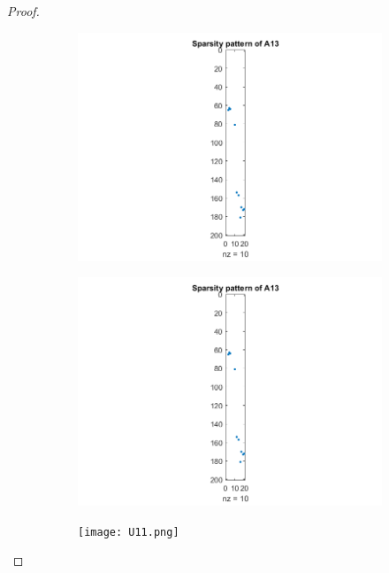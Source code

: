 \documentclass[12pt]{report}
\begin{document}
\begin{problem}
\begin{proof}
\begin{figure}[H]
  \begin{subfigure}[b]{0.5\linewidth}
    \centering
    \includegraphics[width=\linewidth]{A13.png}
    \caption{}
    \label{fig:a}
    \vspace{4ex}
  \end{subfigure}%
  \begin{subfigure}[b]{0.5\linewidth}
    \centering
    \includegraphics[width=\linewidth]{A13.png}
    \caption{}
    \label{fig:b}
    \vspace{4ex}
  \end{subfigure}
  \begin{subfigure}[b]{0.5\linewidth}
    \centering
    \texttt{[image: U11.png]}

\end{subfigure}
\end{figure}
\end{proof}
\end{problem}
\end{document}
